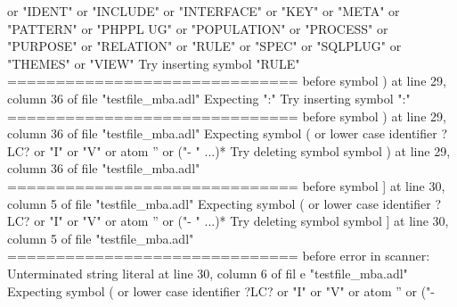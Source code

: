 {  or "IDENT" or "INCLUDE" or "INTERFACE" or "KEY" or "META" or "PATTERN" or "PHPPL\newline
  UG" or "POPULATION" or "PROCESS" or "PURPOSE" or "RELATION" or "RULE" or "SPEC"\newline
  or "SQLPLUG" or "THEMES" or "VIEW"\newline
  Try inserting symbol "RULE"\newline
  \newline
  ==============================\newline
  \newline
  before symbol ) at line 29, column 36 of file "testfile\_mba.adl"\newline
  Expecting ":"\newline
  Try inserting symbol ":"\newline
  \newline
  ==============================\newline
  \newline
  before symbol ) at line 29, column 36 of file "testfile\_mba.adl"\newline
  Expecting symbol ( or lower case identifier ?LC? or "I" or "V" or atom '' or ("-\newline
  " ...)*\newline
  Try deleting symbol symbol ) at line 29, column 36 of file "testfile\_mba.adl"\newline
  \newline
  ==============================\newline
  \newline
  before symbol ] at line 30, column 5 of file "testfile\_mba.adl"\newline
  Expecting symbol ( or lower case identifier ?LC? or "I" or "V" or atom '' or ("-\newline
  " ...)*\newline
  Try deleting symbol symbol ] at line 30, column 5 of file "testfile\_mba.adl"\newline
  \newline
  ==============================\newline
  \newline
  before error in scanner: Unterminated string literal at line 30, column 6 of fil\newline
  e "testfile\_mba.adl"\newline
  Expecting symbol ( or lower case identifier ?LC? or "I" or "V" or atom '' or ("-\newline
}
